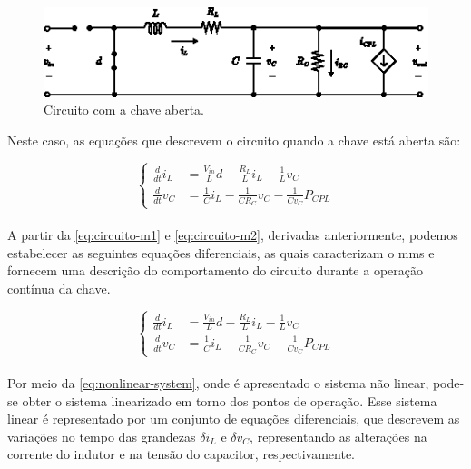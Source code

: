 \begin{figure}[H]
  \centering
  \includegraphics[scale=2.5]{figuras/buck_conversor_with_cpl_circuit_m2.eps}
  \caption{Circuito com a chave aberta.}
  \label{fig:circuit3}
\end{figure}

Neste caso, as equações que descrevem o circuito quando a chave está aberta são:

\begin{equation}
  \begin{cases}
    \frac{d}{dt}i_L  & = \frac{V_{in}}{L} d - \frac{R_L}{L} i_L - \frac{1}{L} v_C        \\
    \frac{d}{dt} v_C & = \frac{1}{C} i_L - \frac{1}{C R_C} v_C - \frac{1}{C v_C} P_{CPL}
    \label{eq:circuito-m2}
  \end{cases}
\end{equation}
\\
A partir da \autoref{eq:circuito-m1} e \autoref{eq:circuito-m2}, derivadas anteriormente, podemos estabelecer as seguintes equações diferenciais, as quais caracterizam o \acrshort{mms} e fornecem uma descrição do comportamento do circuito durante a operação contínua da chave.

\begin{equation}
  \begin{cases}
    \frac{d}{dt}i_L  & = \frac{V_{in}}{L} d - \frac{R_L}{L} i_L - \frac{1}{L} v_C        \\
    \frac{d}{dt} v_C & = \frac{1}{C} i_L - \frac{1}{C R_C} v_C - \frac{1}{C v_C} P_{CPL}
    \label{eq:nonlinear-system}
  \end{cases}
\end{equation}
\\
\indent Por meio da \autoref{eq:nonlinear-system}, onde é apresentado o sistema não linear, pode-se obter o sistema linearizado em torno dos pontos de operação. Esse sistema linear é representado por um conjunto de equações diferenciais, que descrevem as variações no tempo das grandezas $\delta i_L$ e $\delta v_C$, representando as alterações na corrente do indutor e na tensão do capacitor, respectivamente.

